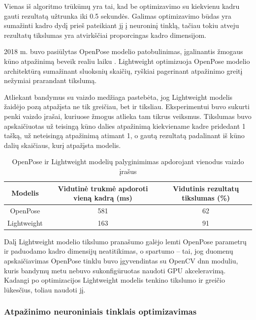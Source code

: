 \documentclass{VUMIFPSbakalaurinis}
\begin{document}
Vienas iš algoritmo trūkūmų yra tai, kad be optimizavimo su kiekvienu kadru gauti rezultatą užtrunka iki 0.5 sekundės. Galimas optimizavimo būdas yra sumažinti kadro dydį prieš pateikiant jį į neuroninį tinklą, tačiau tokiu atveju rezultatų tikslumas yra atvirkščiai proporcingas kadro dimensijom. 

2018 m. buvo pasiūlytas OpenPose modelio patobulinimas, įgalinantis žmogaus kūno atpažinimą beveik realiu laiku \cite{osokin2018realtime}. Lightweight optimizuoja OpenPose modelio architektūrą sumažinant sluoksnių skaičių, ryškiai pagerinant atpažinimo greitį nežymiai prarandant tikslumą. 

Atliekant bandymus su vaizdo medžiaga pastebėta, jog Lightweight modelis žaidėjo pozą atpažįsta ne tik greičiau, bet ir tiksliau. Eksperimentui buvo sukurti penki vaizdo įrašai, kuriuose žmogus atlieka tam tikrus veiksmus. Tikslumas buvo apskaičiuotas už teisingą kūno dalies atpažinimą kiekviename kadre pridedant 1 tašką, už neteisingą atpažinimą atimant 1, o gautą rezultatą padalinant iš kūno dalių skaičiaus, kurį atpažįsta modelis.

\begin{table}[H]\footnotesize
	\centering
	\caption{OpenPose ir Lightweight modelių palyginimimas apdorojant vienodus vaizdo įrašus}
	{\begin{tabular}{|c|c|c|} \hline
			\textbf{Modelis} & \textbf{Vidutinė trukmė apdoroti vieną kadrą (ms)} & \textbf{Vidutinis rezultatų tikslumas (\%)} \\
			\hline
			OpenPose  & 581    & 62       \\
			\hline
			Lightweight  & 163    & 91       \\
			\hline
	\end{tabular}}
	\label{tab:openposevslightweight}
\end{table}

Dalį Lightweight modelio tikslumo pranašumo galėjo lemti OpenPose parametrų ir paduodamo kadro dimensijų neatitikimas, o spartumo – tai, jog duomenų apskaičiavimas OpenPose tinklu buvo įgyvendintas su OpenCV dnn moduliu, kuris bandymų metu nebuvo sukonfigūruotas naudoti GPU akceleravimą. Kadangi po optimizacijos Lightweight modelis tenkino tikslumo ir greičio lūkesčius, toliau naudoti jį. 

\subsubsection{Atpažinimo neuroniniais tinklais optimizavimas}
\end{document}
